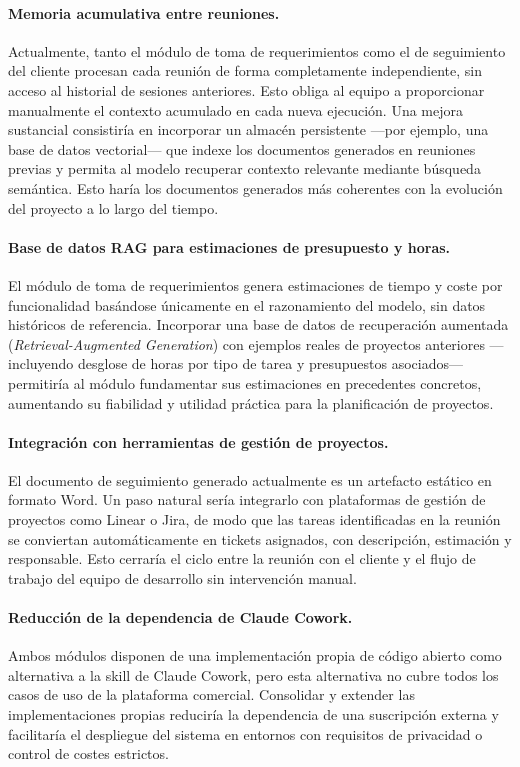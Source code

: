\documentclass[11pt, letterpaper]{article}
\begin{document}
\paragraph{Memoria acumulativa entre reuniones.}
Actualmente, tanto el módulo de toma de requerimientos como el de seguimiento del cliente procesan cada reunión de forma completamente independiente, sin acceso al historial de sesiones anteriores. Esto obliga al equipo a proporcionar manualmente el contexto acumulado en cada nueva ejecución. Una mejora sustancial consistiría en incorporar un almacén persistente ---por ejemplo, una base de datos vectorial--- que indexe los documentos generados en reuniones previas y permita al modelo recuperar contexto relevante mediante búsqueda semántica. Esto haría los documentos generados más coherentes con la evolución del proyecto a lo largo del tiempo.

\paragraph{Base de datos RAG para estimaciones de presupuesto y horas.}
El módulo de toma de requerimientos genera estimaciones de tiempo y coste por funcionalidad basándose únicamente en el razonamiento del modelo, sin datos históricos de referencia. Incorporar una base de datos de recuperación aumentada (\textit{Retrieval-Augmented Generation}) con ejemplos reales de proyectos anteriores ---incluyendo desglose de horas por tipo de tarea y presupuestos asociados--- permitiría al módulo fundamentar sus estimaciones en precedentes concretos, aumentando su fiabilidad y utilidad práctica para la planificación de proyectos.

\paragraph{Integración con herramientas de gestión de proyectos.}
El documento de seguimiento generado actualmente es un artefacto estático en formato Word. Un paso natural sería integrarlo con plataformas de gestión de proyectos como Linear o Jira, de modo que las tareas identificadas en la reunión se conviertan automáticamente en tickets asignados, con descripción, estimación y responsable. Esto cerraría el ciclo entre la reunión con el cliente y el flujo de trabajo del equipo de desarrollo sin intervención manual.

\paragraph{Reducción de la dependencia de Claude Cowork.}
Ambos módulos disponen de una implementación propia de código abierto como alternativa a la skill de Claude Cowork, pero esta alternativa no cubre todos los casos de uso de la plataforma comercial. Consolidar y extender las implementaciones propias reduciría la dependencia de una suscripción externa y facilitaría el despliegue del sistema en entornos con requisitos de privacidad o control de costes estrictos.
\end{document}
